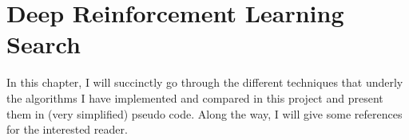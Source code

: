 
\chapter{Deep Reinforcement Learning Search} %

\label{Chapter1} %

In this chapter, I will succinctly go through the different techniques that underly the algorithms I have implemented and compared in this project and present them in (very simplified) pseudo code. Along the way, I will give some references for the interested reader.




\label{GSH}


